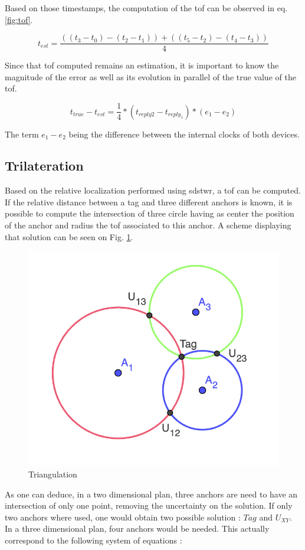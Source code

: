 Based on those timestamps, the computation of the \gls{tof} can be observed in eq. \ref{fig:tof}.

\begin{equation}
	t_{est} = \frac{((t_3 - t_0) - (t_2 - t_1)) + ((t_5 - t_2) - (t_4 - t_3))}{4}
\label{fig:tof}
\end{equation}

Since that \gls{tof} computed remains an estimation, it is important to know the magnitude of the error as well as its evolution in parallel of the true value of the \gls{tof}.

\begin{equation}
	t_{true} - t_{est} = \frac{1}{4}*(t_{reply2} - t_{reply_1})*(e_1 - e_2)
\end{equation}

The term $e_1 - e_2$ being the difference between the internal clocks of both devices. \cite{dalce2011comparison}

\subsection{Trilateration}
\label{tril}

Based on the relative localization performed using \gls{sdstwr}, a \gls{tof} can be computed. If the relative distance between a tag and three different anchors is known, it is possible to compute the intersection of three circle having as center the position of the anchor and radius the \gls{tof} associated to this anchor. A scheme displaying that solution can be seen on Fig. \ref{fig:triangulation}.

\begin{figure}[H]
\centering
\includegraphics[width=.5\linewidth]{Images/trilateration.png}
\caption{Triangulation}
\label{fig:triangulation}
\end{figure}

As one can deduce, in a two dimensional  plan, three anchors are need to have an intersection of only one point, removing the uncertainty on the solution. If only two anchors where used, one would obtain two possible solution : $Tag$ and $U_{XY}$. In a three dimensional plan, four anchors would be needed. This actually correspond to 
the following system of equations :

